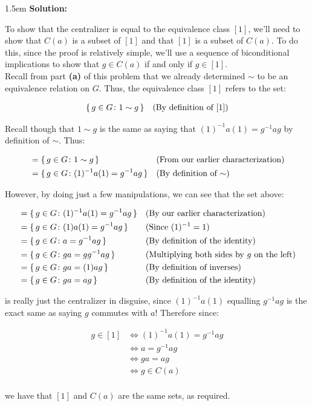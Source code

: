 \documentclass{article}
\newenvironment{solution}{
	\vspace{.5em}
	\par
	\begin{adjustwidth}{1.5em}{}
	\textbf{{Solution:}}
	\par
	\vspace{.5em}
}{
	\vspace{1em}
	\end{adjustwidth}
	\setcounter{step}{0}
	\newpage
}
\newcounter{step}
\newcounter{problem}
\begin{document}
\begin{solution}
	To show that the centralizer is equal to the equivalence class $[1]$, we'll need to show that $C(a)$ is a subset of $[1]$ and that $[1]$ is a subset of $C(a)$. To do this, since the proof is relatively simple, we'll use a sequence of biconditional implications to show that $g \in C(a)$ if and only if $g \in [1]$. \\

	Recall from part \textbf{(a)} of this problem that we already determined $\sim$ to be an equivalence relation on $G$. Thus, the equivalence class $[1]$ refers to the set:

	\begin{align*}
		\set{g \in G \colon 1 \sim g} &&\text{(By definition of $[1]$)} \\
	\end{align*}

	Recall though that $1 \sim g$ is the same as saying that $(1)^{-1}a(1) = g^{-1}ag$ by definition of $\sim$. Thus:

	\begin{align*}
		[1] &= \set{g \in G \colon 1 \sim g} &&\text{(From our earlier characterization)} \\
		&= \set{g \in G \colon (1)^{-1}a(1) = g^{-1}ag} &&\text{(By definition of $\sim$)} \\
	\end{align*}

	However, by doing just a few manipulations, we can see that the set above:

	\begin{align*}
		[1] &= \set{g \in G \colon (1)^{-1}a(1) = g^{-1}ag} &&\text{(By our earlier characterization)} \\
		&= \set{g \in G \colon (1)a(1) = g^{-1}ag} &&\text{(Since $(1)^{-1} = 1$)} \\
		&= \set{g \in G \colon a = g^{-1}ag} &&\text{(By definition of the identity)} \\
		&= \set{g \in G \colon ga = gg^{-1}ag} &&\text{(Multiplying both sides by $g$ on the left)} \\
		&= \set{g \in G \colon ga = (1)ag} &&\text{(By definition of inverses)} \\
		&= \set{g \in G \colon ga = ag} &&\text{(By definition of the identity)} \\
	\end{align*}

	is really just the centralizer in disguise, since $(1)^{-1}a(1)$ equalling $g^{-1}ag$ is the exact same as saying $g$ commutes with $a$! Therefore since:

	\begin{align*}
		g \in [1] &\iff (1)^{-1}a(1) = g^{-1}ag \\
		&\iff a = g^{-1}ag \\
		&\iff ga = ag \\
		&\iff g \in C(a) \\
	\end{align*}

	we have that $[1]$ and $C(a)$ are the same sets, as required.
\end{solution}
\end{document}
